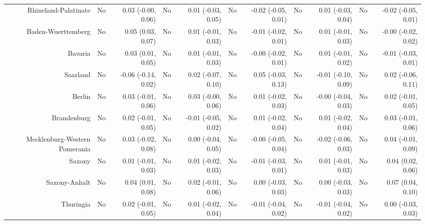 \documentclass[
  man,floatsintext]{apa6}
\newenvironment{lltable}{\begin{landscape}\centering\begin{ThreePartTable}}{\end{ThreePartTable}\end{landscape}}
\begin{document}
\begin{lltable}
{\begin{longtable}{rrrrrrrrrrr}
Rhineland-Palatinate & No & 0.03 (-0.00, 0.06) & No & 0.01 (-0.03, 0.05) & No & -0.02 (-0.05, 0.01) & No & 0.01 (-0.03, 0.04) & No & -0.02 (-0.05, 0.01)\\
Baden-Wuerttemberg & No & 0.05 (0.03, 0.07) & No & 0.01 (-0.01, 0.03) & No & -0.01 (-0.02, 0.01) & No & 0.01 (-0.01, 0.03) & No & -0.00 (-0.02, 0.02)\\
Bavaria & No & 0.03 (0.01, 0.05) & No & 0.01 (-0.01, 0.03) & No & -0.00 (-0.02, 0.01) & No & 0.01 (-0.01, 0.02) & No & -0.01 (-0.03, 0.01)\\
Saarland & No & -0.06 (-0.14, 0.02) & No & 0.02 (-0.07, 0.10) & No & 0.05 (-0.03, 0.13) & No & -0.01 (-0.10, 0.09) & No & 0.02 (-0.06, 0.11)\\
Berlin & No & 0.03 (-0.01, 0.06) & No & 0.03 (-0.00, 0.06) & No & 0.01 (-0.02, 0.03) & No & -0.00 (-0.04, 0.03) & No & 0.02 (-0.01, 0.05)\\
Brandenburg & No & 0.02 (-0.01, 0.05) & No & -0.01 (-0.05, 0.02) & No & 0.01 (-0.02, 0.04) & No & 0.01 (-0.02, 0.04) & No & 0.03 (-0.01, 0.06)\\
Mecklenburg-Western Pomerania & No & 0.03 (-0.02, 0.08) & No & 0.00 (-0.04, 0.05) & No & -0.00 (-0.05, 0.04) & No & -0.02 (-0.06, 0.03) & No & 0.04 (-0.01, 0.09)\\
Saxony & No & 0.01 (-0.01, 0.03) & No & 0.01 (-0.02, 0.03) & No & -0.01 (-0.03, 0.01) & No & 0.01 (-0.01, 0.03) & No & 0.04 (0.02, 0.06)\\
Saxony-Anhalt & No & 0.04 (0.01, 0.08) & No & 0.02 (-0.01, 0.06) & No & 0.00 (-0.03, 0.03) & No & 0.00 (-0.03, 0.03) & No & 0.07 (0.04, 0.10)\\
Thuringia & No & 0.02 (-0.01, 0.05) & No & 0.01 (-0.02, 0.04) & No & -0.01 (-0.04, 0.02) & No & -0.01 (-0.04, 0.02) & No & 0.00 (-0.03, 0.03)\\
\bottomrule
\end{longtable}

}

\end{lltable}
\end{document}
